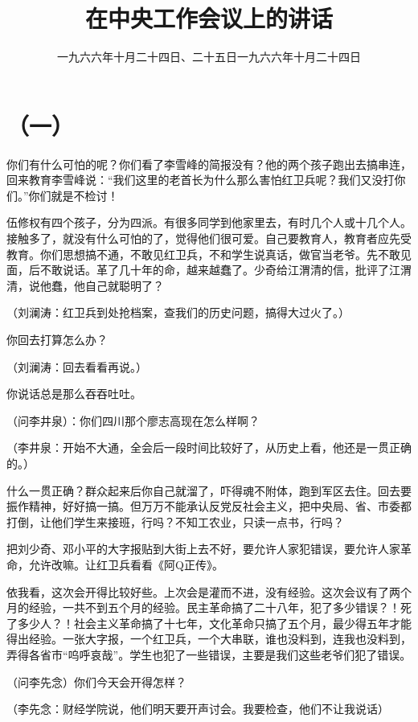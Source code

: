 
\title{在中央工作会议上的讲话}
\date{一九六六年十月二十四日、二十五日}
\maketitle


\date{一九六六年十月二十四日}
\section*{（一）}

你们有什么可怕的呢？你们看了李雪峰的简报没有？他的两个孩子跑出去搞串连，回来教育李雪峰说：“我们这里的老首长为什么那么害怕红卫兵呢？我们又没打你们。”你们就是不检讨！

伍修权有四个孩子，分为四派。有很多同学到他家里去，有时几个人或十几个人。接触多了，就没有什么可怕的了，觉得他们很可爱。自己要教育人，教育者应先受教育。你们思想搞不通，不敢见红卫兵，不和学生说真话，做官当老爷。先不敢见面，后不敢说话。革了几十年的命，越来越蠢了。少奇给江渭清的信，批评了江渭清，说他蠢，他自己就聪明了？

（刘澜涛：红卫兵到处抢档案，查我们的历史问题，搞得大过火了。）

你回去打算怎么办？

（刘澜涛：回去看看再说。）

你说话总是那么吞吞吐吐。

（问李井泉）：你们四川那个廖志高现在怎么样啊？

（李井泉：开始不大通，全会后一段时间比较好了，从历史上看，他还是一贯正确的。）

什么一贯正确？群众起来后你自己就溜了，吓得魂不附体，跑到军区去住。回去要振作精神，好好搞一搞。但万万不能承认反党反社会主义，把中央局、省、市委都打倒，让他们学生来接班，行吗？不知工农业，只读一点书，行吗？

把刘少奇、邓小平的大字报贴到大街上去不好，要允许人家犯错误，要允许人家革命，允许改嘛。让红卫兵看看《阿Q正传》。

依我看，这次会开得比较好些。上次会是灌而不进，没有经验。这次会议有了两个月的经验，一共不到五个月的经验。民主革命搞了二十八年，犯了多少错误？！死了多少人？！社会主义革命搞了十七年，文化革命只搞了五个月，最少得五年才能得出经验。一张大字报，一个红卫兵，一个大串联，谁也没料到，连我也没料到，弄得各省市“呜呼哀哉”。学生也犯了一些错误，主要是我们这些老爷们犯了错误。

（问李先念）你们今天会开得怎样？

（李先念：财经学院说，他们明天要开声讨会。我要检查，他们不让我说话）

